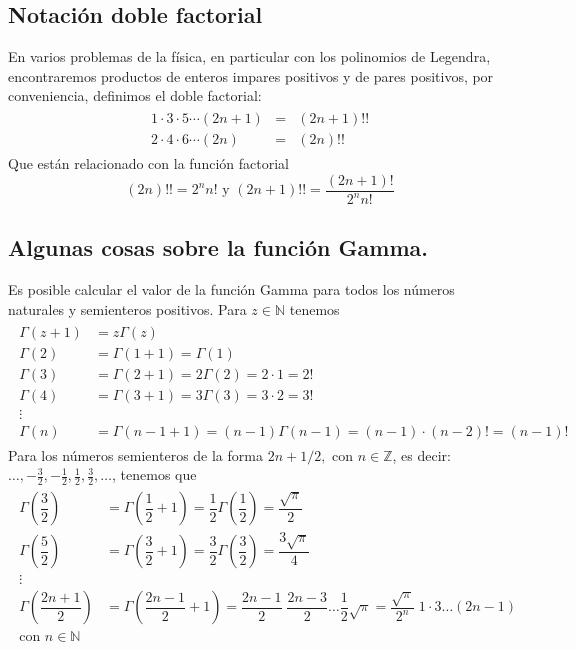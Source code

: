 \subsection{Notación doble factorial}
En varios problemas de la física, en particular con los polinomios de Legendra, encontraremos productos de enteros impares positivos y de pares positivos, por conveniencia, definimos el doble factorial:
\begin{eqnarray}
\begin{aligned}
1 \cdot 3 \cdot 5 \cdots (2n+1) &=& (2n+1) !! \\
2 \cdot 4 \cdot 6 \cdots (2n) &=& (2n) !!
\end{aligned}
\end{eqnarray}
Que están relacionado con la función factorial
\begin{equation}
(2n)!! =  2^{n} n! \text{ y } (2n+1)!! = \dfrac{(2n+1)!}{2^{n}n!}
\end{equation}
\subsection{Algunas cosas sobre la función Gamma.}
Es posible calcular el valor de la función Gamma para todos los números naturales y semienteros positivos. Para $z \in \mathbb{N}$ tenemos
\begin{eqnarray}
\begin{aligned}
\Gamma (z+1) &= z \Gamma (z) \\
\Gamma (2) &= \Gamma (1+1) = \Gamma (1) \\
\Gamma (3) &= \Gamma (2+1) = 2 \Gamma (2)= 2 \cdot 1 = 2! \\
\Gamma (4) &= \Gamma (3+1) = 3 \Gamma (3)= 3 \cdot 2 = 3! \\
\vdots \\
\Gamma (n) &= \Gamma (n-1+1) = (n-1) \Gamma (n-1)= (n - 1) \cdot (n - 2)! = (n-1)!
\end{aligned}
\end{eqnarray}
Para los números semienteros de la forma $2n+1/2, \mbox{ con } n \in \mathbb{Z}$, es decir: $\ldots, -\frac{3}{2}, - \frac{1}{2}, \frac{1}{2}, \frac{3}{2}, \ldots$, tenemos que
\begin{eqnarray}
\begin{aligned}
\Gamma \left( \dfrac{3}{2} \right) &= \Gamma \left( \dfrac{1}{2} + 1 \right) = \dfrac{1}{2} \Gamma \left( \dfrac{1}{2} \right) = \dfrac{\sqrt{\pi}}{2} \\
\Gamma \left( \dfrac{5}{2} \right) &= \Gamma \left( \dfrac{3}{2} + 1 \right) = \dfrac{3}{2} \Gamma \left( \dfrac{3}{2} \right) = \dfrac{3 \sqrt{\pi}}{4} \\
\vdots \\
\Gamma \left( \dfrac{2n + 1}{2} \right) &= \Gamma \left( \dfrac{2n - 1}{2} + 1 \right) = \dfrac{2n - 1}{2} \; \dfrac{2n - 3}{2} \ldots \dfrac{1}{2} \sqrt{\pi} = \dfrac{\sqrt{\pi}}{2^{n}} \; 1 \cdot 3 \ldots (2n-1) \\
\mbox{con } n \in \mathbb{N}
\end{aligned}
\end{eqnarray}
